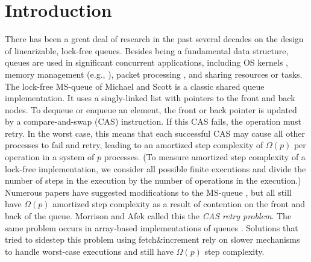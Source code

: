 
\section{Introduction}

There has been a great deal of research in the past several decades on the design of linearizable, lock-free queues.
Besides being a fundamental data structure, queues are used in
significant concurrent applications, including OS kernels \cite{MP91}, memory management (e.g., \cite{BBFRSW21}),
packet processing \cite{DPDK},
and sharing resources or tasks.
The lock-free MS-queue of Michael and Scott \cite{MS98} is a classic shared queue implementation.
It uses a singly-linked list with pointers to the front and back nodes.
To dequeue or enqueue an element, the front or back pointer is updated by a 
compare-and-swap (CAS) instruction.
If this CAS fails, the operation must retry.
In the worst case, this means that each successful CAS may cause all other processes to
fail and retry, leading to an amortized step complexity of $\Omega(p)$ per operation in a system of $p$ processes.
(To measure amortized step complexity of a lock-free implementation, we consider all possible finite executions
and divide the number of steps in the execution by the number of operations  in the execution.)
Numerous papers have suggested modifications to the MS-queue \cite{DBLP:conf/opodis/HoffmanSS07,DBLP:conf/podc/KoganH14,DBLP:conf/ppopp/KoganP11,DBLP:journals/dc/Ladan-MozesS08,MKLLP22,DBLP:conf/spaa/MoirNSS05,RC17}, but 
all still have $\Omega(p)$ amortized step complexity as a result of
contention on the front and back of the queue.
Morrison and Afek \cite{DBLP:conf/ppopp/MorrisonA13} called this the \emph{CAS retry problem}.
The same problem occurs in array-based implementations of queues \cite{DBLP:conf/iceccs/ColvinG05,DBLP:conf/icdcn/Shafiei09,DBLP:conf/spaa/TsigasZ01,DBLP:conf/opodis/GidenstamST10}.
Solutions that tried to sidestep this problem using fetch\&increment \cite{DBLP:conf/ppopp/MorrisonA13,DBLP:conf/ppopp/YangM16,Nik19,10.1145/3490148.3538572}
rely on slower mechanisms to handle worst-case executions and still have $\Omega(p)$ step complexity.


